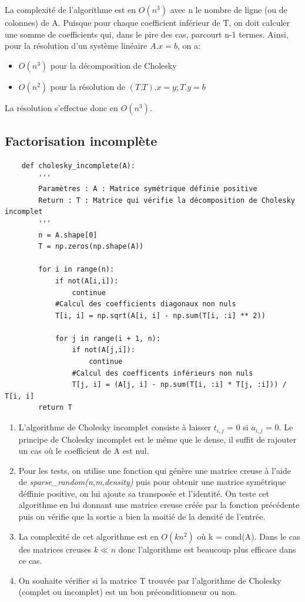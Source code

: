 \documentclass{article}
\begin{document}
La complexité de l'algorithme est en \(O(n^{3})\) avec n le nombre de ligne (ou de colonnes) de A. Puisque pour chaque coefficient inférieur de T, on doit calculer une somme de coefficients qui, dans le pire des cas, parcourt n-1 termes.
Ainsi, pour la résolution d'un système linéaire \(A.x = b\), on a:
\begin{itemize}
    \item \(O(n^{3})\) pour la décomposition de Cholesky
    \item \(O(n^{2})\) pour la résolution de \((T.T).x = y ; T.y = b\)
\end{itemize}
La résolution s'effectue donc en \(O(n^{3})\).
\subsection*{Factorisation incomplète}

\begin{verbatim}
    def cholesky_incomplete(A):
        '''
        Paramètres : A : Matrice symétrique définie positive
        Return : T : Matrice qui vérifie la décomposition de Cholesky incomplet
        '''
        n = A.shape[0]
        T = np.zeros(np.shape(A))
    
        for i in range(n):
            if not(A[i,i]):
                continue
            #Calcul des coefficients diagonaux non nuls
            T[i, i] = np.sqrt(A[i, i] - np.sum(T[i, :i] ** 2))
            
            for j in range(i + 1, n):
                if not(A[j,i]):
                    continue
                #Calcul des coefficents inférieurs non nuls
                T[j, i] = (A[j, i] - np.sum(T[i, :i] * T[j, :i])) / T[i, i]
        return T
    \end{verbatim}

\begin{enumerate}
    \item L'algorithme de Cholesky incomplet consiste à laisser $t_{i,j}$ = 0 si $a_{i,j}$ = 0. Le principe de Cholesky incomplet est le même que le dense, il suffit de rajouter un cas où le coefficient de A est nul.
    \item Pour les tests, on utilise une fonction qui génère une matrice creuse à l'aide de \emph{sparse\_random(n,m,density)} puis pour obtenir une matrice symétrique déffinie positive, on lui ajoute sa transposée et l'identité. On teste cet algorithme en lui donnant une matrice creuse créée par la fonction précédente puis on vérifie que la sortie a bien la moitié de la densité de l'entrée.
    \item La complexité de cet algorithme est en \(O(kn^2)\) où k = cond(A). Dans le cas des matrices creuses \(k \ll n\) donc l'algorithme est beaucoup plus efficace dans ce cas.
    \item On souhaite vérifier si la matrice T trouvée par l'algorithme de Cholesky (complet ou incomplet) est un bon préconditionneur ou non.
\end{enumerate}
\end{document}
